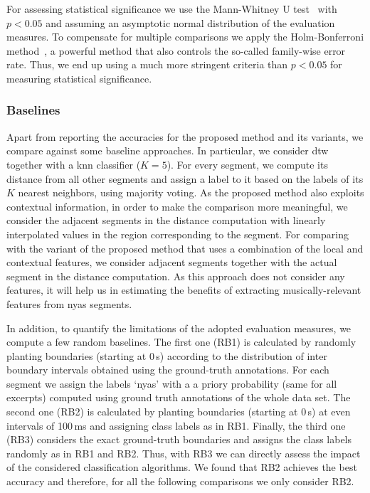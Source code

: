 {For assessing statistical significance we use the Mann-Whitney U test~\citep{mann1947test} with $p<0.05$ and assuming an asymptotic normal distribution of the evaluation measures. To compensate for multiple comparisons we apply the Holm-Bonferroni method~\citep{holm1979simple}, a powerful method that also controls the so-called family-wise error rate. Thus, we end up using a much more stringent criteria than $p<0.05$ for measuring statistical significance.

\subsubsection{Baselines}

Apart from reporting the accuracies for the proposed method and its variants, we compare against some baseline approaches. In particular, we consider \gls{dtw} together with a \gls{knn} classifier ($K=5$). For every segment, we compute its distance from all other segments and assign a label to it based on the labels of its $K$ nearest neighbors, using majority voting. As the proposed method also exploits contextual information, in order to make the comparison more meaningful, we consider the adjacent segments in the distance computation with linearly interpolated values in the region corresponding to the segment. For comparing with the variant of the proposed method that uses a combination of the local and contextual features, we consider adjacent segments together with the actual segment in the distance computation. As this approach does not consider any features, it will help us in estimating the benefits of extracting musically-relevant features from \gls{nyas} segments. 

In addition, to quantify the limitations of the adopted evaluation measures, we compute a few random baselines. The first one (RB1) is calculated by randomly planting boundaries (starting at 0\,s) according to the distribution of inter boundary intervals obtained using the ground-truth annotations. For each segment we assign the labels `\gls{nyas}' with a a priory probability (same for all excerpts) computed using ground truth annotations of the whole data set. The second one (RB2) is calculated by planting boundaries (starting at 0\,s) at even intervals of 100\,ms and assigning class labels as in RB1. Finally, the third one (RB3) considers the exact ground-truth boundaries and assigns the class labels randomly as in RB1 and RB2. Thus, with RB3 we can directly assess the impact of the considered classification algorithms. We found that RB2 achieves the best accuracy and therefore, for all the following comparisons we only consider RB2.

}

